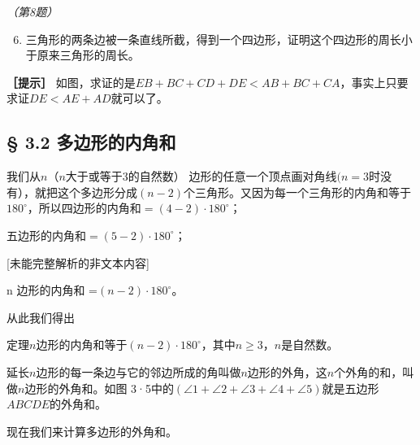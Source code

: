 \emph{（第8题）}

\begin{enumerate}
\setcounter{enumi}{5}
\item
  三角形的两条边被一条直线所截，得到一个四边形，证明这个四边形的周长小于原来三角形的周长。
\end{enumerate}

\textbf{［提示］}
如图，求证的是\(EB + BC + CD + DE < AB + BC + CA\)，事实上只要求证\(DE < AE + AD\)就可以了。

\subsection{§ 3.2
多边形的内角和}

我们从\(n\)（\(n\)大于或等于3的自然数）
边形的任意一个顶点画对角线\((n = 3\)时没有），就把这个多边形分成\((n - 2)\)个三角形。又因为每一个三角形的内角和等于\(180^{\circ}\)，所以四边形的内角和\(= (4 - 2) \cdot 180^{\circ}\)；

五边形的内角和\(= (5 - 2) \cdot 180^{\circ}\)；

{[}未能完整解析的非文本内容{]}

n 边形的内角和 =\((n-2) \cdot 180^{\circ}\)。

从此我们得出

定理\(n\)边形的内角和等于\((n - 2) \cdot 180^{\circ}\)，其中\(n \geqslant 3\)，\(n\)是自然数。

延长\(n\)边形的每一条边与它的邻边所成的角叫做\(n\)边形的外角，这\(n\)个外角的和，叫做\(n\)边形的外角和。如图
3·5中的\((\angle 1 + \angle 2 + \angle 3 + \angle 4 + \angle 5)\)就是五边形\(ABCDE\)的外角和。

现在我们来计算多边形的外角和。

